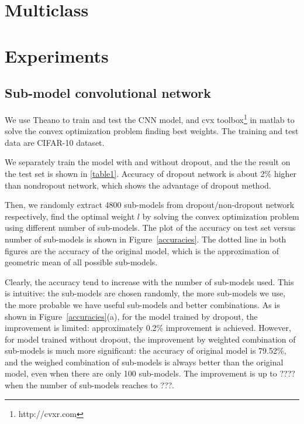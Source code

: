 \documentclass{article} %
\begin{document}
\section{Multiclass}


\section{Experiments}
\subsection{Sub-model convolutional network}
We use Theano\cite{theano} to train and test the CNN model, and cvx toolbox\footnote{http://cvxr.com} in matlab to solve the convex optimization problem finding best weights. The training and test data are CIFAR-10 dataset.
\par
We separately train the model with and without dropout, and the the result on the test set is shown in \ref{table1}. Accuracy of dropout network is about 2\% higher than nondropout network, which shows the advantage of dropout method.
\par
Then, we randomly extract 4800 sub-models from dropout/non-dropout network respectively, find the optimal weight $l$ by solving the convex optimization problem using different number of sub-models. The plot of the accuracy on test set versus number of sub-models is shown in Figure~\ref{accuracies}. The dotted line in both figures are the accuracy of the original model, which is the approximation of geometric mean of all possible sub-models.
\par 
Clearly, the accuracy tend to increase with the number of sub-models used. This is intuitive: the sub-models are chosen randomly, the more sub-models we use, the more probable we have useful sub-models and better combinations. As is shown in Figure~\ref{accuracies}(a), for the model trained by dropout, the improvement is limited: approximately 0.2\% improvement is achieved. However, for model trained without dropout, the improvement by weighted combination of sub-models is much more significant: the accuracy of original model is 79.52\%, and the weighed combination of sub-models is always better than the original model, even when there are only 100 sub-models. The improvement is up to ???? when the number of sub-models reaches to ???.
\par
\end{document}
